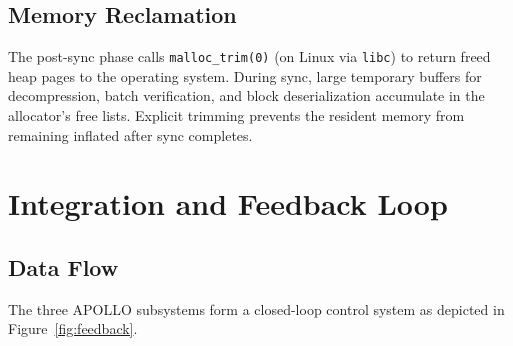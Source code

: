 \documentclass[11pt,a4paper]{article}
\begin{document}
\subsection{Memory Reclamation}

The post-sync phase calls \texttt{malloc\_trim(0)} (on Linux via \texttt{libc}) to return freed heap pages to the operating system. During sync, large temporary buffers for decompression, batch verification, and block deserialization accumulate in the allocator's free lists. Explicit trimming prevents the resident memory from remaining inflated after sync completes.

\section{Integration and Feedback Loop}
\label{sec:integration}

\subsection{Data Flow}

The three APOLLO subsystems form a closed-loop control system as depicted in Figure~\ref{fig:feedback}.
\end{document}
